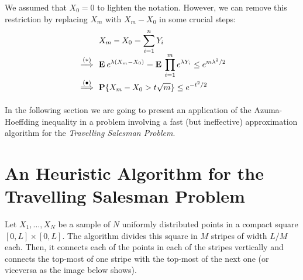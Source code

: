 \begin{remark} We assumed that $X_0 = 0$ to lighten the notation. However, we can remove this restriction by replacing $X_m$ with $X_m - X_0$ in some crucial steps:
    \[\everymath{\displaystyle}\arraycolsep=1.8pt\def\arraystretch{1.8}
        \begin{array}{rl}
            & X_m-X_0 = \sum_{i = 1}^n Y_i\\
            \overset{(*)}{\implies} & \E e^{\lambda (X_m-X_0)} = \E \prod_{i = 1}^{m} e^{\lambda Y_i} \leq e^{m \lambda^2 / 2}\\
            \overset{(\bullet)}{\implies} & \P\{X_m-X_0 > t\sqrt{m}\} \leq e^{-t^2/2}
        \end{array} 
        \] 

\end{remark}    

In the following section we are going to present an application of the Azuma-Hoeffding inequality in a problem involving a fast (but ineffective) approximation algorithm for the \textit{Travelling Salesman Problem}. 

\section{An Heuristic Algorithm for the Travelling Salesman Problem}

Let $X_1,\ldots, X_N$ be a sample of $N$ uniformly distributed points in a compact square $[0,L]\times [0,L]$. The algorithm divides this square in $M$ stripes of width $L/M$ each. Then, it connects each of the points in each of the stripes vertically and connects the top-most of one stripe with the top-most of the next one (or viceversa as the image below shows).

